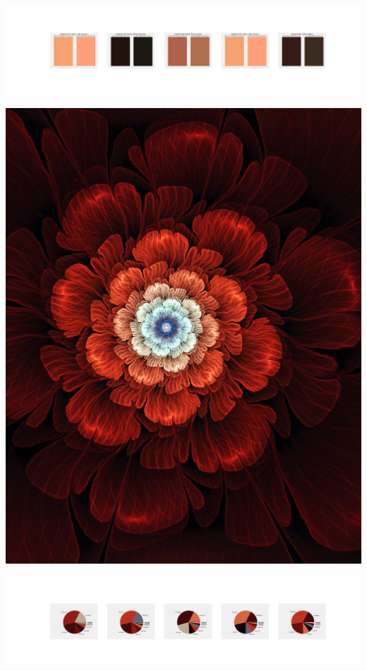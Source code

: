 \documentclass[11pt]{article}
\begin{document}
\begin{landscape}
    \begin{center}
    \includegraphics[width=250mm]{./nbimg/peak-46.jpg}
    \end{center}
    

    \begin{center}
    \includegraphics[width=\textwidth]{./nbimg/file (141).jpg}
    \end{center}

    \begin{center}
    \includegraphics[width=250mm]{./nbimg/pie-47.jpg}
    \end{center}


\end{landscape}
\end{document}
